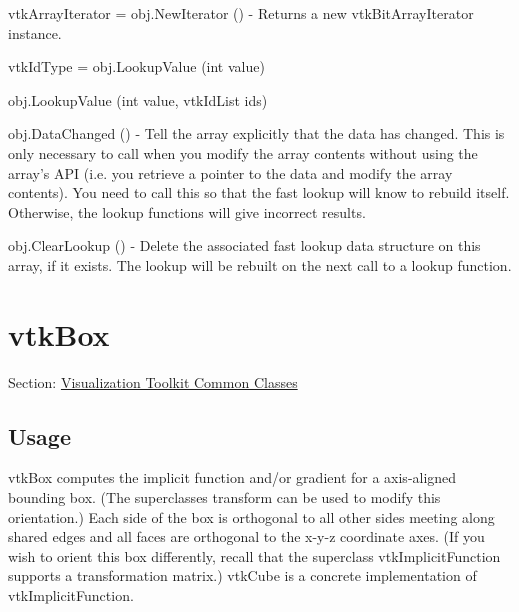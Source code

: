 \begin{DoxyItemize}
\item {\ttfamily vtk\-Array\-Iterator = obj.\-New\-Iterator ()} -\/ Returns a new vtk\-Bit\-Array\-Iterator instance.  
\item {\ttfamily vtk\-Id\-Type = obj.\-Lookup\-Value (int value)}  
\item {\ttfamily obj.\-Lookup\-Value (int value, vtk\-Id\-List ids)}  
\item {\ttfamily obj.\-Data\-Changed ()} -\/ Tell the array explicitly that the data has changed. This is only necessary to call when you modify the array contents without using the array's A\-P\-I (i.\-e. you retrieve a pointer to the data and modify the array contents). You need to call this so that the fast lookup will know to rebuild itself. Otherwise, the lookup functions will give incorrect results.  
\item {\ttfamily obj.\-Clear\-Lookup ()} -\/ Delete the associated fast lookup data structure on this array, if it exists. The lookup will be rebuilt on the next call to a lookup function.  
\end{DoxyItemize}\hypertarget{vtkcommon_vtkbox}{}\section{vtk\-Box}\label{vtkcommon_vtkbox}
Section\-: \hyperlink{sec_vtkcommon}{Visualization Toolkit Common Classes} \hypertarget{vtkwidgets_vtkxyplotwidget_Usage}{}\subsection{Usage}\label{vtkwidgets_vtkxyplotwidget_Usage}
vtk\-Box computes the implicit function and/or gradient for a axis-\/aligned bounding box. (The superclasses transform can be used to modify this orientation.) Each side of the box is orthogonal to all other sides meeting along shared edges and all faces are orthogonal to the x-\/y-\/z coordinate axes. (If you wish to orient this box differently, recall that the superclass vtk\-Implicit\-Function supports a transformation matrix.) vtk\-Cube is a concrete implementation of vtk\-Implicit\-Function.

